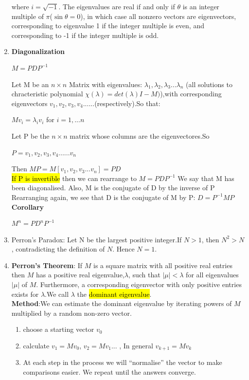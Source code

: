 \documentclass{article}
\begin{document}
\begin{enumerate}
    where $i=\sqrt{-1}$. The eigenvalues are real if and only if $\theta$ is an integer multiple of $\pi$($\sin \theta = 0$), in which case all nonzero vectors are eigenvectors, corresponding to eigenvalue 1 if the integer multiple is even, and corresponding to -1 if the integer multiple is odd.

    \item \textbf{Diagonalization}
    \begin{center}
        $M = PDP^{-1}$
    \end{center}
    Let M be an $n \times n$ Matrix with eigenvalues: $\lambda_1,\lambda_2,\lambda_3...\lambda_n$ (all solutions to chracteristic polynomial $ \chi (\lambda) = det(\lambda) I -M)$),with corresponding eigenvectors $v_1,v_2,v_3,v_4......$(respectively).So that:
    \begin{center}
        $Mv_i = \lambda_i v_i$ for $i = 1, ... n$
    \end{center}
    Let P be the $n \times n$ matrix whose columns are the eigenvectores.So
    \begin{center}
        $P = v_1,v_2,v_3,v_4......v_n$
    \end{center}
    Then $MP = M[v_1,v_2,v_3...v_n] = PD$\\
    \hl{If P is invertible} then we can rearrange to $M = PDP^{-1}$
    We say that M has been diagonalised. Also, M is the conjugate of D by the inverse of P
    Rearranging again, we see that D is the conjugate of M by P: $D = P^{-1}MP$\\

    \textbf{Corollary}
    \begin{center}
        $M^n = P D^n P^{-1}$
    \end{center}


    \item Perron’s Paradox: Let N be the largest positive integer.If $N > 1$, then $N^2 > N$, contradicting the definition of $N$. Hence $N=1$.

    \item \textbf{Perron’s Theorem}: If $M$ is a square matrix with all positive real entries then $M$ has a positive real eigenvalue,$\lambda$, such that $|\mu| < \lambda$ for all eigenvalues $|\mu|$ of $M$. Furthermore, a corresponding eigenvector with only positive entries exists for $\lambda$.We call $\lambda$ the \hl{dominant eigenvalue}.\\

    \textbf{Method}:We can estimate the dominant eigenvalue by iterating powers of $M$ multiplied by a random non-zero vector.
        \begin{enumerate}
            \item choose a starting vector $v_0$
            \item calculate $v_1 = Mv_0$, $v_2 = Mv_1$... , In general $v_{k+1} = Mv_k$
            \item At each step in the process we will “normalise” the vector to make comparisons easier. We repeat until the answers converge.
        \end{enumerate}
\end{enumerate}
\end{document}
